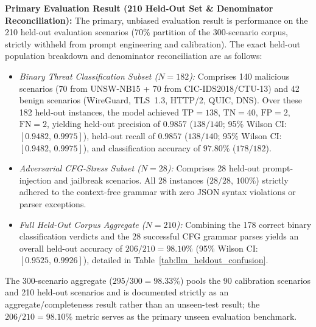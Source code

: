 \documentclass{ieeeaccess}
\renewcommand{\_}{\textunderscore\allowbreak}
\begin{document}
\textbf{Primary Evaluation Result (210 Held-Out Set \& Denominator Reconciliation):}
The primary, unbiased evaluation result is performance on the 210 held-out evaluation scenarios
(70\% partition of the 300-scenario corpus, strictly withheld from prompt engineering and calibration).
The exact held-out population breakdown and denominator reconciliation are as follows:
\begin{itemize}
  \item \textit{Binary Threat Classification Subset ($N=182$):} Comprises 140 malicious scenarios (70 from UNSW-NB15 + 70 from CIC-IDS2018/CTU-13) and 42 benign scenarios (WireGuard, TLS~1.3, HTTP/2, QUIC, DNS). Over these 182 held-out instances, the model achieved $\text{TP}=138$, $\text{TN}=40$, $\text{FP}=2$, $\text{FN}=2$, yielding held-out precision of $0.9857$ ($138/140$; 95\% Wilson CI: $[0.9482,\,0.9975]$), held-out recall of $0.9857$ ($138/140$; 95\% Wilson CI: $[0.9482,\,0.9975]$), and classification accuracy of $97.80\%$ ($178/182$).
  \item \textit{Adversarial CFG-Stress Subset ($N=28$):} Comprises 28 held-out prompt-injection and jailbreak scenarios. All 28 instances ($28/28$, $100\%$) strictly adhered to the context-free grammar with zero JSON syntax violations or parser exceptions.
  \item \textit{Full Held-Out Corpus Aggregate ($N=210$):} Combining the 178 correct binary classification verdicts and the 28 successful CFG grammar parses yields an overall held-out accuracy of $206/210 = 98.10\%$ (95\% Wilson CI: $[0.9525,\,0.9926]$), detailed in Table~\ref{tab:llm_heldout_confusion}.
\end{itemize}
The 300-scenario aggregate ($295/300 = 98.33\%$) pools the 90 calibration scenarios and 210 held-out scenarios and is documented strictly as an aggregate/completeness result rather than an unseen-test result; the $206/210 = 98.10\%$ metric serves as the primary unseen evaluation benchmark.
\end{document}
